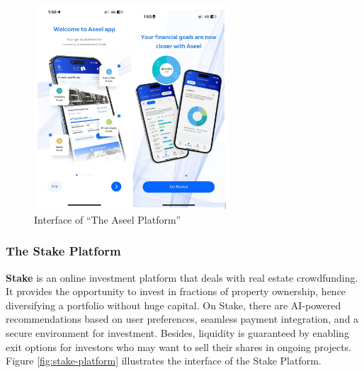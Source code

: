 \newpage

\begin{figure}[htbp]
    \centering
    \includegraphics[width=0.65\textwidth]{images/Interface-of-the Aseel Platform.png}
    \caption{Interface of ``The Aseel Platform''}
    \label{fig:aseel-platform}
\end{figure}

\begin{center}
    \vspace{0.5em}
    \vspace{0.5em}
\end{center}

\subsubsection{The Stake Platform}

\textbf{\textcolor{primary}{Stake}} is an online investment platform that deals with real estate crowdfunding. It provides the opportunity to invest in fractions of property ownership, hence diversifying a portfolio without huge capital. On Stake, there are AI-powered recommendations based on user preferences, seamless payment integration, and a secure environment for investment. Besides, liquidity is guaranteed by enabling exit options for investors who may want to sell their shares in ongoing projects. Figure \ref{fig:stake-platform} illustrates the interface of the Stake Platform.

